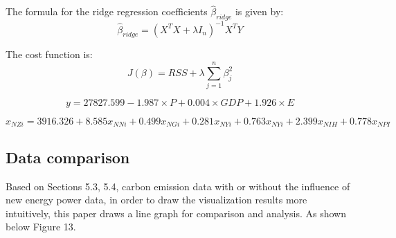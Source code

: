 \documentclass{article}
\begin{document}
	The formula for the ridge regression coefficients $\hat{\beta}_{ridge}$ is given by:
	\begin{equation}
		\hat{\beta}_{ridge}=(X^{T}X+\lambda I_{n})^{-1}X^{T}Y
	\end{equation}
	
	The cost function is:
	\begin{equation}
		J(\beta) = RSS + \lambda \sum_{j=1}^{n}\beta_{j}^{2}
	\end{equation}
	
	\begin{table}[H]
		\centering
		\caption{Results of ridge regression analysis.}
	\end{table}
	
	\begin{equation}
		y = 27827.599 - 1.987 \times P + 0.004 \times GDP + 1.926 \times E
	\end{equation}
	
	\begin{equation}
		x_{NZi} = 3916.326 + 8.585 x_{NNi} + 0.499 x_{NGi} + 0.281 x_{NYi} + 0.763 x_{NYi} + 2.399 x_{NIH} + 0.778 x_{NPI}
	\end{equation}
	
	\subsection{Data comparison}
	Based on Sections 5.3, 5.4, carbon emission data with or without the influence of new energy power data, in order to draw the visualization results more intuitively, this paper draws a line graph for comparison and analysis. As shown below Figure 13.
	
\end{document}

